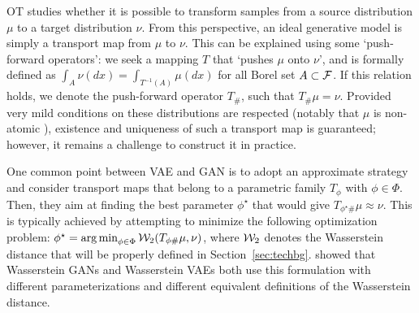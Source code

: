 
OT studies whether it is possible to transform samples from a source distribution $\mu$ to a target distribution $\nu$. From this perspective, an ideal generative model is simply a transport map from $\mu$ to $\nu$.  
This can be explained using some `push-forward operators': we seek a mapping $T$ that `pushes $\mu$ onto $\nu$', and is formally defined as $\int_A \nu(dx) = \int_{T^{-1}(A)} \mu(dx) $ for all Borel set $A \subset \mathcal{F}$. If this relation holds, we denote the push-forward operator $T_\#$, such that $T_\# \mu = \nu$. Provided very mild conditions on these distributions are respected (notably that $\mu$ is non-atomic \cite{villani2008optimal}), existence and uniqueness of such a transport map is guaranteed; however, it remains a challenge to construct it in practice.

One common point between VAE and GAN is to adopt an approximate strategy and consider transport maps that belong to a parametric family $T_{\phi}$ with $\phi \in \Phi$. Then, they aim at finding the best parameter $\phi^\star$ that would give $T_{\phi^\star \#}\mu \approx \nu$. This is typically achieved by attempting to minimize the following optimization problem:
$\phi^\star = \operatorname*{arg\min}_{\phi \in \Phi} {\cal W}_2(T_{\phi \#}\mu, \nu)$,
where ${\cal W}_2$ denotes the Wasserstein distance that will be properly defined in Section~\ref{sec:techbg}.  \cite{genevay2017gan} showed that Wasserstein GANs \cite{arjovsky2017wasserstein} and Wasserstein VAEs \cite{tolstikhin2017wasserstein} both use this formulation with different parameterizations and different equivalent definitions of the Wasserstein distance. %

